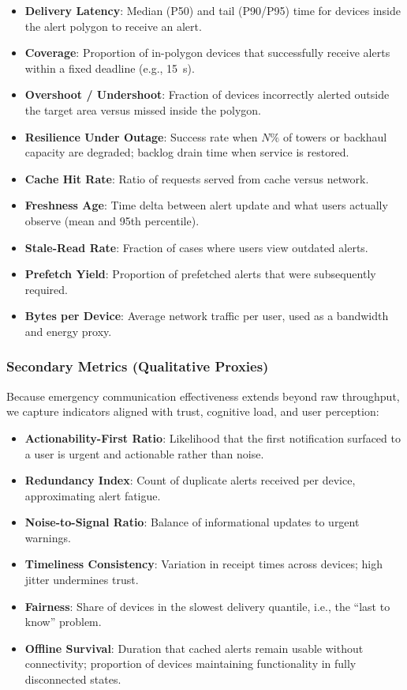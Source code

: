 \documentclass[11pt,twocolumn]{article}
\begin{document}
\begin{itemize}
    \item \textbf{Delivery Latency}: Median (P50) and tail (P90/P95) time for devices inside the alert polygon to receive an alert.
    \item \textbf{Coverage}: Proportion of in-polygon devices that successfully receive alerts within a fixed deadline (e.g., 15~s).
    \item \textbf{Overshoot / Undershoot}: Fraction of devices incorrectly alerted outside the target area versus missed inside the polygon.
    \item \textbf{Resilience Under Outage}: Success rate when $N\%$ of towers or backhaul capacity are degraded; backlog drain time when service is restored.
    \item \textbf{Cache Hit Rate}: Ratio of requests served from cache versus network.
    \item \textbf{Freshness Age}: Time delta between alert update and what users actually observe (mean and 95th percentile).
    \item \textbf{Stale-Read Rate}: Fraction of cases where users view outdated alerts.
    \item \textbf{Prefetch Yield}: Proportion of prefetched alerts that were subsequently required.
    \item \textbf{Bytes per Device}: Average network traffic per user, used as a bandwidth and energy proxy.
\end{itemize}

\subsubsection{Secondary Metrics (Qualitative Proxies)}
Because emergency communication effectiveness extends beyond raw throughput, we capture indicators aligned with trust, cognitive load, and user perception:

\begin{itemize}
    \item \textbf{Actionability-First Ratio}: Likelihood that the first notification surfaced to a user is urgent and actionable rather than noise.
    \item \textbf{Redundancy Index}: Count of duplicate alerts received per device, approximating alert fatigue.
    \item \textbf{Noise-to-Signal Ratio}: Balance of informational updates to urgent warnings.
    \item \textbf{Timeliness Consistency}: Variation in receipt times across devices; high jitter undermines trust.
    \item \textbf{Fairness}: Share of devices in the slowest delivery quantile, i.e., the ``last to know'' problem.
    \item \textbf{Offline Survival}: Duration that cached alerts remain usable without connectivity; proportion of devices maintaining functionality in fully disconnected states.
\end{itemize}
\end{document}
